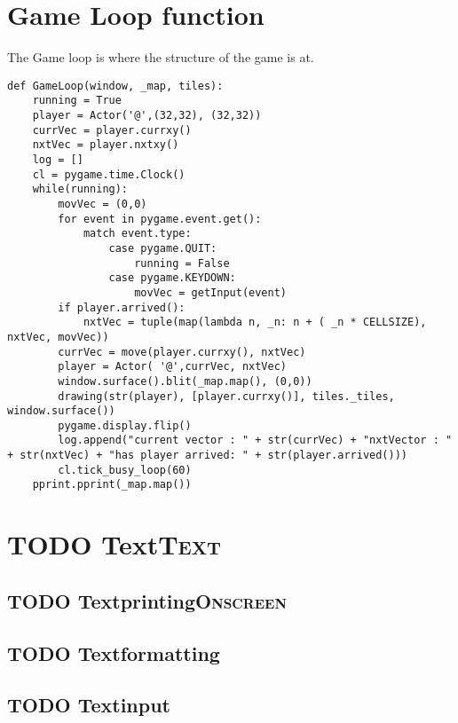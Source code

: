 \documentclass[11pt]{article}
\begin{document}
\section{Game Loop function}
\label{sec:org53aee92}

The Game loop is where the structure of the game is at.

\begin{verbatim}
def GameLoop(window, _map, tiles):
    running = True
    player = Actor('@',(32,32), (32,32))
    currVec = player.currxy()
    nxtVec = player.nxtxy()
    log = []
    cl = pygame.time.Clock()
    while(running):
        movVec = (0,0)
        for event in pygame.event.get():
            match event.type:
                case pygame.QUIT:
                    running = False
                case pygame.KEYDOWN:
                    movVec = getInput(event)
        if player.arrived():
            nxtVec = tuple(map(lambda n, _n: n + ( _n * CELLSIZE), nxtVec, movVec))           
        currVec = move(player.currxy(), nxtVec)
        player = Actor( '@',currVec, nxtVec)
        window.surface().blit(_map.map(), (0,0))
        drawing(str(player), [player.currxy()], tiles._tiles, window.surface())
        pygame.display.flip()
        log.append("current vector : " + str(currVec) + "nxtVector : " + str(nxtVec) + "has player arrived: " + str(player.arrived()))
        cl.tick_busy_loop(60)
    pprint.pprint(_map.map())
\end{verbatim}


\section{{\bfseries\sffamily TODO} Text\hfill{}\textsc{Text}}
\label{sec:orge1c0444}

\subsection{{\bfseries\sffamily TODO} Textprinting\hfill{}\textsc{Onscreen}}
\label{sec:org428af1a}

\subsection{{\bfseries\sffamily TODO} Textformatting}
\label{sec:orgb04070c}

\subsection{{\bfseries\sffamily TODO} Textinput}
\label{sec:org26f1ada}
\end{document}
